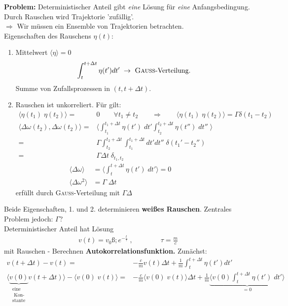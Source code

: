 \documentclass[12pt]{article}
\begin{document}
\textbf{Problem:} Deterministischer Anteil gibt \textit{eine} Lösung für \textit{eine} Anfangsbedingung. Durch Rauschen wird Trajektorie 'zufällig'. \\
$\Rightarrow$ Wir müssen ein Ensemble von Trajektorien betrachten.\\
Eigenschaften des Rauschens $\eta (t)$:
\begin{enumerate}
\item Mittelwert $\langle \eta \rangle = 0 $
\begin{align}
\int_t^{t + \Delta t} \eta (t') dt' \; \to \mbox{ \textsc{Gauss}-Verteilung.}
\end{align}
Summe von Zufallsprozessen in $(t, t+\Delta t)$.
\item Rauschen ist unkorreliert. Für gilt:
\begin{align*}
 \langle \eta(t_1) \; \eta (t_2) \rangle =& 0 \qquad \forall t_1 \neq t_2  \qquad \Rightarrow \qquad
 \langle \eta(t_1) \; \eta (t_2) \rangle = \Gamma \delta (t_1 - t_2)\\
 \langle\Delta \omega(t_2), \Delta \omega(t_2)\rangle
 =& \langle \int_{t_1}^{t_1 + \Delta t} \eta (t')  \; dt'  \int_{t_2}^{t_2 + \Delta t} \eta (t'') \;  dt'' \; \rangle  \\
 =& \Gamma  \int_{t_2}^{t_2 + \Delta t} \int_{t_1}^{t_1 + \Delta t} dt' dt'' \; \delta(t_1'-t_2'') \\
 =& \Gamma \Delta t\;  \delta_{t_1,t_2} 
\end{align*}
\begin{align}
 \langle \Delta \omega \rangle &= \langle \int_t^{t+\Delta t}  \eta (t') \; dt' \rangle =0 \qquad \qquad  \\
 \langle \Delta \omega^2 \rangle &= \Gamma \; \Delta t
\end{align}
erfüllt durch \textsc{Gauß}-Verteilung mit $\Gamma \Delta $
\end{enumerate}
Beide Eigenschaften, 1. und 2. determinieren \textbf{weißes Rauschen}. Zentrales Problem jedoch: $\Gamma $?\\
Deterministischer Anteil hat Lösung
\begin{align}
v(t) = v_0 ß; e^{- \frac{t}{\tau}} \; , \qquad \qquad \tau = \frac{m}{c}
\end{align}
mit Rauschen - Berechnen \textbf{Autokorrelationsfunktion.} Zunächst:
\begin{align*}
v(t+ \Delta t ) - v(t) =& - \frac{c}{m} v(t) \Delta t + \frac{1}{m} \int_t^{t+\Delta t} \eta (t') dt' \\
\langle \underbrace{  v(0)}_{ \substack{\text{eine} \\ \text{ Kon-} \\ \text{stante}}} v(t+ \Delta t ) \rangle - \langle v(0) \; v(t) \rangle =&- \frac{c}{m} \langle v(0)\;  v(t) \rangle \Delta t + \frac{1}{m} \underbrace{ \langle v(0) \int_t^{t+\Delta t} \eta (t') \; dt' \rangle }_\text{$=0$} 
\end{align*}
\end{document}
